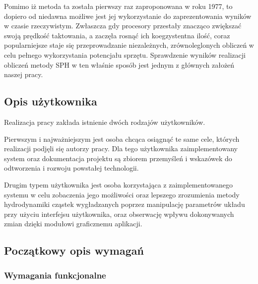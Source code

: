 \documentclass[polish, 12pt]{aghthesis}
\begin{document}
	$\,$
	
	Pomimo iż metoda ta została pierwszy raz zaproponowana w roku 1977, to dopiero od niedawna możliwe jest jej wykorzystanie do zaprezentowania wyników w czasie rzeczywistym. Zwłaszcza gdy procesory przestały znacząco zwiększać swoją prędkość taktowania, a zaczęła rosnąć ich koegzystentna ilość, coraz popularniejsze staje się przeprowadzanie niezależnych, zrównoleglonych obliczeń w celu pełnego wykorzystania potencjału sprzętu. Sprawdzenie wyników realizacji obliczeń metody SPH w ten właśnie sposób jest jednym z głównych założeń naszej pracy.
	
	\clearpage	
	
	\subsection{Opis użytkownika}
	
	Realizacja pracy zakłada istnienie dwóch rodzajów użytkowników.
	
	Pierwszym i najważniejszym jest osoba chcąca osiągnąć te same cele, których realizacji podjęli się autorzy pracy. Dla tego użytkownika zaimplementowany system oraz dokumentacja projektu są zbiorem przemyśleń i wskazówek do odtworzenia i rozwoju powstałej technologii.
	
	Drugim typem użytkownika jest osoba korzystająca z zaimplementowanego systemu w celu zobaczenia jego możliwości oraz lepszego zrozumienia metody hydrodynamiki cząstek wygładzanych poprzez manipulację parametrów układu przy użyciu interfejsu użytkownika, oraz obserwację wpływu dokonywanych zmian dzięki modułowi graficznemu aplikacji.
	
	\subsection{Początkowy opis wymagań}
	
		\subsubsection{Wymagania funkcjonalne}
		
\end{document}
